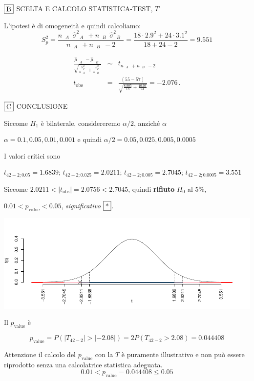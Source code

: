 \documentclass[
  11pt,
]{book}
\theoremstyle{mytheoremstyle}
\theoremstyle{mydefstyle}
\begin{document}
\(\fbox{B}\) SCELTA E CALCOLO STATISTICA-TEST, \(T\)

L'ipotesi è di omogeneità e quindi calcoliamo:\[
   S_p^2=\frac{n_\text{ $A$ }\hat\sigma^2_\text{ $A$ }+n_\text{ $B$ }\hat\sigma^2_\text{ $B$ }}{n_\text{ $A$ }+n_\text{ $B$ }-2} =
   \frac{ 18 \cdot 2.9 ^2+ 24 \cdot 3.1 ^2}{ 18 + 24 -2}= 9.551 
  \]

\begin{eqnarray*}
  \frac{\hat\mu_\text{ $A$ } - \hat\mu_\text{ $B$ }}
  {\sqrt{\frac {S^2_p}{n_\text{ $A$ }}+\frac {S^2_p}{n_\text{ $B$ }}}}&\sim&t_{n_\text{ $A$ }+n_\text{ $B$ }-2}\\
  t_{\text{obs}}
  &=& \frac{ ( 55 -  57 )} {\sqrt{\frac{ 8.905 }{ 18 }+\frac{ 10.03 }{ 24 }}}
  =   -2.076 \, .
  \end{eqnarray*}

\(\fbox{C}\) CONCLUSIONE

Siccome \(H_1\) è bilaterale, considereremo \(\alpha/2\),
anziché \(\alpha\)

\(\alpha=0.1, 0.05, 0.01, 0.001\) e quindi \(\alpha/2=0.05, 0.025, 0.005, 0.0005\)

I valori critici sono

\(t_{42-2;0.05}=1.6839\); \(t_{42-2;0.025}=2.0211\); \(t_{42-2;0.005}=2.7045\); \(t_{42-2;0.0005}=3.551\)

Siccome \(2.0211<|t_\text{obs}|=2.0756<2.7045\), quindi \textbf{rifiuto} \(H_0\) al 5\%,

\(0.01<p_\text{value}<0.05\), \emph{significativo} \(\fbox{*}\).

\begin{center}\includegraphics{Appunti_di_Statistica_2025_files/figure-latex/16-test-2C-2-1} \end{center}

Il \(p_{\text{value}}\) è

\[ p_{\text{value}} = P(|T_{42-2}|>|-2.08|)=2P(T_{42-2}>2.08)=0.044408 \]

Attenzione il calcolo del \(p_\text{value}\) con la \(T\) è puramente illustrativo e non può essere riprodotto senza una calcolatrice statistica adeguata.\[
 0.01 < p_\text{value}= 0.044408 \leq 0.05 
\]
\end{document}
